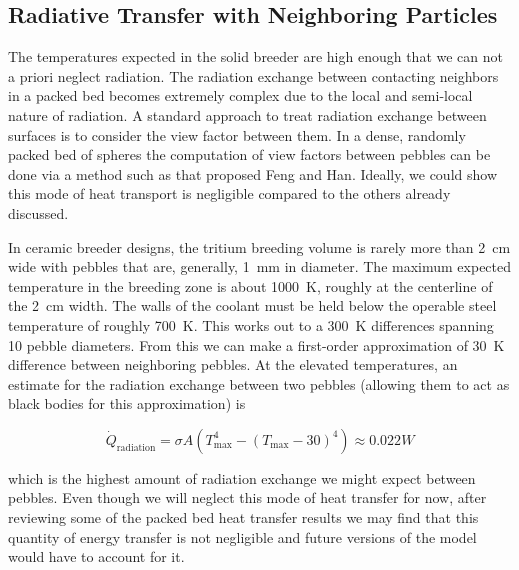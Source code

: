 \subsection{Radiative Transfer with Neighboring Particles}

The temperatures expected in the solid breeder are high enough that we can not a priori neglect radiation. The radiation exchange between contacting neighbors in a packed bed becomes extremely complex due to the local and semi-local nature of radiation. A standard approach to treat radiation exchange between surfaces is to consider the view factor between them. In a dense, randomly packed bed of spheres the computation of view factors between pebbles can be done via a method such as that proposed Feng and Han\cite{Feng2012}. Ideally, we could show this mode of heat transport is negligible compared to the others already discussed.

In ceramic breeder designs, the tritium breeding volume is rarely more than \si{2 cm} wide with pebbles that are, generally, \si{1 mm} in diameter. The maximum expected temperature in the breeding zone is about \si{1000 K}, roughly at the centerline of the \si{2 cm} width. The walls of the coolant must be held below the operable steel temperature of roughly \si{700 K}. This works out to a \si{300 K} differences spanning 10 pebble diameters. From this we can make a first-order approximation of \si{30 K} difference between neighboring pebbles. At the elevated temperatures, an estimate for the radiation exchange between two pebbles (allowing them to act as black bodies for this approximation) is

\begin{equation}
	\dot{Q}_\text{radiation} = \sigma A \left(T_\text{max}^4 - (T_\text{max}-30)^4\right) \approx 0.022\si{W}
\end{equation}
 
 which is the highest amount of radiation exchange we might expect between pebbles. Even though we will neglect this mode of heat transfer for now, after reviewing some of the packed bed heat transfer results we may find that this quantity of energy transfer is not negligible and future versions of the model would have to account for it.